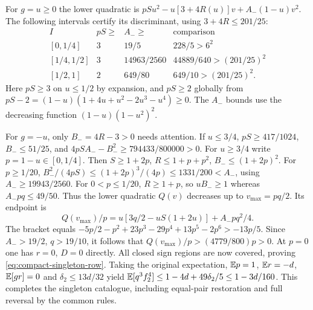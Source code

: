 For $g=u\ge0$ the lower quadratic is
$pSu^2-u[3+4R(u)]v+A_-(1-u)v^2$.
The following intervals certify its discriminant, using $3+4R\le201/25$:
\[
 \begin{array}{c|c|c|c}
 I&pS\ge&A_-\ge&\text{comparison}\\\hline
 {}[0,1/4]&3&19/5&228/5>6^2\\
 {}[1/4,1/2]&3&14963/2560&44889/640>(201/25)^2\\
 {}[1/2,1]&2&649/80&649/10>(201/25)^2.
 \end{array}
\]
Here $pS\ge3$ on $u\le1/2$ by expansion, and $pS\ge2$ globally from
$pS-2=(1-u)(1+4u+u^2-2u^3-u^4)\ge0$.
The $A_-$ bounds use the decreasing function $(1-u)(1-u^2)^2$.

For $g=-u$, only $B_-=4R-3>0$ needs attention.
If $u\le3/4$, $pS\ge417/1024$, $B_-\le51/25$, and
$4pSA_--B_-^2\ge794433/800000>0$.
For $u\ge3/4$ write $p=1-u\in[0,1/4]$.
Then $S\ge1+2p$, $R\le1+p+p^2$, $B_-\le(1+2p)^2$.
For $p\ge1/20$,
$B_-^2/(4pS)\le(1+2p)^3/(4p)\le1331/200<A_-$,
using $A_-\ge19943/2560$.
For $0<p\le1/20$, $R\ge1+p$, so $uB_-\ge1$ whereas
$A_-pq\le49/50$. Thus the lower quadratic $Q(v)$ decreases up to
$v_{\max}=pq/2$. Its endpoint is
\[
 Q(v_{\max})/p=u[3q/2-uS(1+2u)]+A_-pq^2/4.
\]
The bracket equals
$-5p/2-p^2+23p^3-29p^4+13p^5-2p^6>-13p/5$.
Since $A_->19/2$, $q>19/10$, it follows that
$Q(v_{\max})/p>(4779/800)p>0$.
At $p=0$ one has $r=0$, $D=0$ directly.
All closed sign regions are now covered, proving
\eqref{eq:compact-singleton-row}.
Taking the original expectation, $\mathbb E p=1$, $\mathbb E r=-d$, $\mathbb E[gr]=0$ and
$\delta_{2}\le13d/32$ yield
$\mathbb E[q^3f_2^4]\le1-4d+49\delta_{2}/5\le1-3d/160$.
This completes the singleton catalogue, including equal-pair restoration
and full reversal by the common rules.
